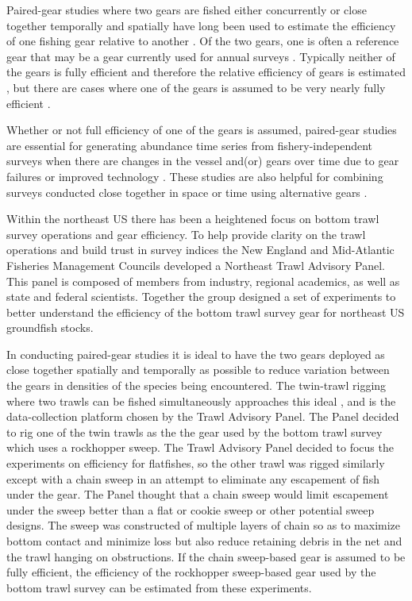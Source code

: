 \documentclass[
  12pt,
]{article}
\begin{document}
Paired-gear studies where two gears are fished either concurrently or
close together temporally and spatially have long been used to estimate
the efficiency of one fishing gear relative to another
\citep[e.g.,][]{gulland64,bourne65}. Of the two gears, one is often a
reference gear that may be a gear currently used for annual surveys
\citep[e.g.,][]{munrosomerton01}. Typically neither of the gears is
fully efficient and therefore the relative efficiency of gears is
estimated \citep[e.g.,][]{miller13,kotwickietal17}, but there are cases
where one of the gears is assumed to be very nearly fully efficient
\citep[e.g.,][]{somertonetal13, milleretal19}.

Whether or not full efficiency of one of the gears is assumed,
paired-gear studies are essential for generating abundance time series
from fishery-independent surveys when there are changes in the vessel
and(or) gears over time due to gear failures or improved technology
\citep{pelletier98}. These studies are also helpful for combining
surveys conducted close together in space or time using alternative
gears \citep{kotwickietal13}.

Within the northeast US there has been a heightened focus on bottom
trawl survey operations and gear efficiency. To help provide clarity on
the trawl operations and build trust in survey indices the New England
and Mid-Atlantic Fisheries Management Councils developed a Northeast
Trawl Advisory Panel. This panel is composed of members from industry,
regional academics, as well as state and federal scientists. Together
the group designed a set of experiments to better understand the
efficiency of the bottom trawl survey gear for northeast US groundfish
stocks.

In conducting paired-gear studies it is ideal to have the two gears
deployed as close together spatially and temporally as possible to
reduce variation between the gears in densities of the species being
encountered. The twin-trawl rigging \citep{kragetal15} where two trawls
can be fished simultaneously approaches this ideal \citep{ices96}, and
is the data-collection platform chosen by the Trawl Advisory Panel. The
Panel decided to rig one of the twin trawls as the the gear used by the
bottom trawl survey which uses a rockhopper sweep. The Trawl Advisory
Panel decided to focus the experiments on efficiency for flatfishes, so
the other trawl was rigged similarly except with a chain sweep in an
attempt to eliminate any escapement of fish under the gear. The Panel
thought that a chain sweep would limit escapement under the sweep better
than a flat or cookie sweep or other potential sweep designs. The sweep
was constructed of multiple layers of chain so as to maximize bottom
contact and minimize loss but also reduce retaining debris in the net
and the trawl hanging on obstructions. If the chain sweep-based gear is
assumed to be fully efficient, the efficiency of the rockhopper
sweep-based gear used by the bottom trawl survey can be estimated from
these experiments.
\end{document}
